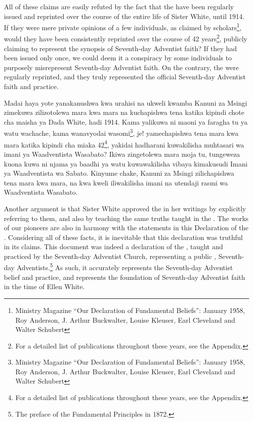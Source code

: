 All of these claims are easily refuted by the fact that the  have been regularly issued and reprinted over the course of the entire life of Sister White, until 1914. If they were mere private opinions of a few individuals, as claimed by scholars\footnote{Ministry Magazine “Our Declaration of Fundamental Beliefs”: January 1958, Roy Anderson, J. Arthur Buckwalter, Louise Kleuser, Earl Cleveland and Walter Schubert}, would they have been consistently reprinted over the course of 42 years\footnote{For a detailed list of publications throughout these years, see the Appendix.}, publicly claiming to represent the synopsis of Seventh-day Adventist faith? If they had been issued only once, we could deem it a conspiracy by some individuals to purposely misrepresent Seventh-day Adventist faith. On the contrary, the  were regularly reprinted, and they truly represented the official Seventh-day Adventist faith and practice.


Madai haya yote yanakanushwa kwa urahisi na ukweli kwamba Kanuni za Msingi zimekuwa zilizotolewa mara kwa mara na kuchapishwa tena katika kipindi chote cha maisha ya Dada White, hadi 1914. Kama yalikuwa ni maoni ya faragha tu ya watu wachache, kama wanavyodai wasomi\footnote{Ministry Magazine “Our Declaration of Fundamental Beliefs”: January 1958, Roy Anderson, J. Arthur Buckwalter, Louise Kleuser, Earl Cleveland and Walter Schubert}, je! yamechapishwa tena mara kwa mara katika kipindi cha miaka 42\footnote{For a detailed list of publications throughout these years, see the Appendix.}, yakidai hadharani kuwakilisha muhtasari wa imani ya Waadventista Wasabato? Ikiwa zingetolewa mara moja tu, tungeweza kuona kuwa ni njama ya baadhi ya watu kuwawakilisha vibaya kimakusudi Imani ya Waadventista wa Sabato. Kinyume chake, Kanuni za Msingi zilichapishwa tena mara kwa mara, na kwa kweli iliwakilisha imani na utendaji rasmi wa Waadventista Wasabato.


Another argument is that Sister White approved the  in her writings by explicitly referring to them, and also by teaching the same truths taught in the . The works of our pioneers are also in harmony with the statements in this Declaration of the . Considering all of these facts, it is inevitable that this declaration was truthful in its claims. This document was indeed a declaration of the , taught and practiced by the Seventh-day Adventist Church, representing a public ,  Seventh-day Adventists.\footnote{The preface of the Fundamental Principles in 1872.} As such, it accurately represents the Seventh-day Adventist belief and practice, and represents the foundation of Seventh-day Adventist faith in the time of Ellen White.


